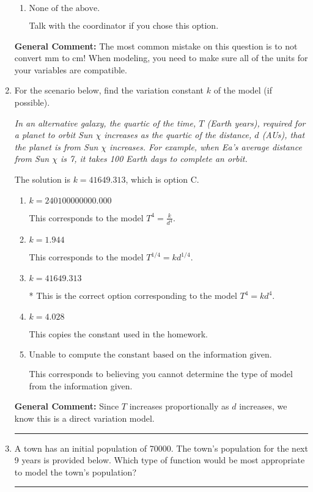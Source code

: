 \documentclass{extbook}[14pt]
\newcommand{\litem}[1]{\item #1

\rule{\textwidth}{0.4pt}}
\begin{document}
\begin{enumerate}
{\begin{enumerate}[label=\Alph*.]
This option uses the model $R = kl^{3}$ as if this is a direct variation.
\item \( \text{None of the above.} \)

Talk with the coordinator if you chose this option.
\end{enumerate}

\textbf{General Comment:} The most common mistake on this question is to not convert mm to cm! When modeling, you need to make sure all of the units for your variables are compatible.
}
\litem{
For the scenario below, find the variation constant $k$ of the model (if possible).

\begin{center}
    \textit{ In an alternative galaxy, the quartic of the time, $T$ (Earth years), required for a planet to orbit Sun $\chi$ increases as the quartic of the distance, $d$ (AUs), that the planet is from Sun $\chi$ increases. For example, when Ea's average distance from Sun $\chi$ is 7, it takes 100 Earth days to complete an orbit. }
\end{center}
The solution is \( k = 41649.313 \), which is option C.\begin{enumerate}[label=\Alph*.]
\item \( k = 240100000000.000 \)

This corresponds to the model $T^{4} = \frac{k}{d^{4}}$.
\item \( k = 1.944 \)

This corresponds to the model $T^{1/4} = k d^{1/4}$.
\item \( k = 41649.313 \)

* This is the correct option corresponding to the model $T^{4} = k d^{4}$.
\item \( k = 4.028 \)

This copies the constant used in the homework.
\item \( \text{Unable to compute the constant based on the information given.} \)

This corresponds to believing you cannot determine the type of model from the information given.
\end{enumerate}

\textbf{General Comment:} Since $T$ increases proportionally as $d$ increases, we know this is a direct variation model.
}
\litem{
A town has an initial population of 70000. The town's population for the next 9 years is provided below. Which type of function would be most appropriate to model the town's population?


}
\end{enumerate}
\end{document}
